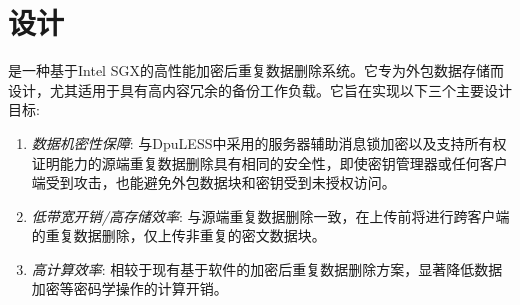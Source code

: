 \section{\sysnameS 设计}
\label{sec:sgxdedup-design}


\sysnameS 是一种基于Intel SGX的高性能加密后重复数据删除系统。它专为外包数据存储而设计，尤其适用于具有高内容冗余的备份工作负载。它旨在实现以下三个主要设计目标:
\begin{enumerate}
    \item \textit{数据机密性保障}: 与DpuLESS\cite{bellare2013DupLESS}中采用的服务器辅助消息锁加密以及支持所有权证明\cite{halevi11}能力的源端重复数据删除具有相同的安全性，即使密钥管理器或任何客户端受到攻击，\sysnameS 也能避免外包数据块和密钥受到未授权访问。
    \item \textit{低带宽开销/高存储效率}: 与源端重复数据删除一致，\sysnameS 在上传前将进行跨客户端的重复数据删除，仅上传非重复的密文数据块。
    \item \textit{高计算效率}: 相较于现有基于软件的加密后重复数据删除方案，\sysnameS 显著降低数据加密等密码学操作的计算开销。
\end{enumerate}

